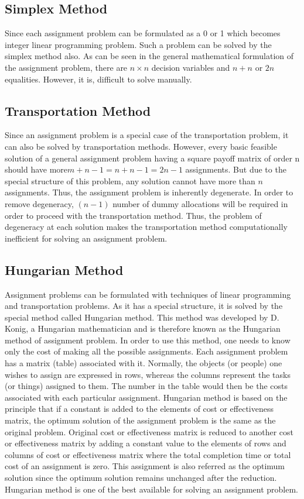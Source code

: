 \documentclass[11pt]{report}
\begin{document}
	\subsection{Simplex Method}
	Since each assignment problem can be formulated as a 0 or 1 which becomes integer linear programming problem. Such a problem can be solved by the simplex method also. As can be seen in the general mathematical formulation of the assignment problem, there are $n\times n$ decision variables and $n+n$ or $2n$ equalities. However, it is, difficult to solve manually.
	
	\subsection{Transportation Method}
	Since an assignment problem is a special case of the transportation problem, it can also be solved
	by transportation methods. However, every basic feasible solution of a general assignment problem having a square payoff matrix of order n should have more$ m+n-1= n+n-1=2n-1$
	assignments. But due to the special structure of this problem, any solution cannot have more than $n$ assignments. Thus, the assignment problem is inherently degenerate. In order to remove degeneracy, $(n-1)$ number of dummy allocations will be required in order to proceed with the
	transportation method. Thus, the problem of degeneracy at each solution makes the transportation method computationally inefficient for solving an assignment problem.
	
	\subsection{Hungarian Method}
	Assignment problems can be formulated with techniques of linear programming and transportation problems. As it has a special structure, it is solved by the special method called Hungarian method. This method was developed by D. Konig, a Hungarian mathematician and is therefore known as the Hungarian method of assignment problem. In order to use this method, one needs to know only the cost of making all the possible assignments. Each assignment problem has a matrix (table) associated with it. Normally, the objects (or people) one wishes to assign are expressed in rows, whereas the columns represent the tasks (or things) assigned to them. The number in the table would then be the costs associated with each particular assignment. Hungarian method is based on the principle that if a constant is added to the elements of cost or effectiveness matrix, the optimum solution of the assignment problem is the same as the original problem. Original cost or effectiveness matrix is reduced to another cost or effectiveness matrix by adding a constant value
	to the elements of rows and columns of cost or effectiveness matrix where the total completion time or total cost of an assignment is zero. This assignment is also referred as the optimum solution since the optimum solution remains unchanged after the reduction. Hungarian method is one of the best available for solving an assignment problem.
	
\end{document}
